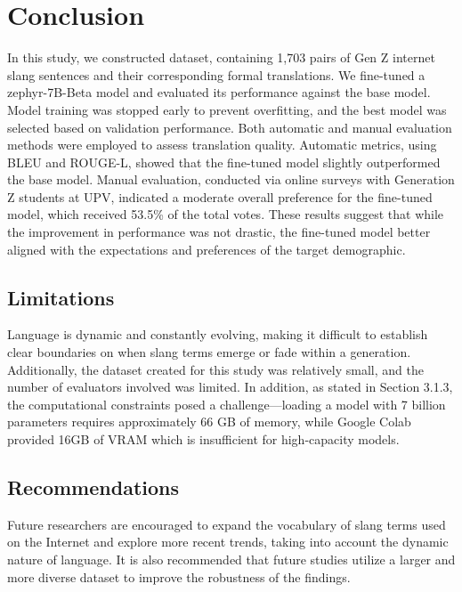 \chapter{Conclusion}
In this study, we constructed dataset, containing 1,703 pairs of Gen Z internet slang sentences and their corresponding formal translations. We fine-tuned a zephyr-7B-Beta model and  evaluated its performance against the base model. Model training was stopped early to prevent overfitting, and the best model was selected based on validation performance. Both automatic and manual evaluation methods were employed to assess translation quality. Automatic metrics, using BLEU and ROUGE-L, showed that the fine-tuned model slightly outperformed the base model. Manual evaluation, conducted via online surveys with Generation Z students at UPV, indicated a moderate overall preference for the fine-tuned model, which received 53.5\% of the total votes. These results suggest that while the improvement in performance was not drastic, the fine-tuned model better aligned with the expectations and preferences of the target demographic.

\section{Limitations}
Language is dynamic and constantly evolving, making it difficult to establish clear boundaries on when slang terms emerge or fade within a generation. Additionally, the dataset created for this study was relatively small, and the number of evaluators involved was limited. In addition, as stated in Section 3.1.3, the computational constraints posed a challenge—loading a model with 7 billion parameters requires approximately 66 GB of memory, while Google Colab provided 16GB of VRAM which is insufficient for high-capacity models.

\section{Recommendations}
Future researchers are encouraged to expand the vocabulary of slang terms used on the Internet and explore more recent trends, taking into account the dynamic nature of language. It is also recommended that future studies utilize a larger and more diverse dataset to improve the robustness of the findings.